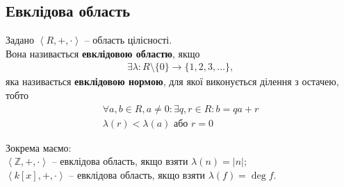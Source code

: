 \documentclass{math_library}
\begin{document}

\subsection{Евклідова область}
\begin{definition}
Задано $\left< R, +, \cdot \right>$ -- область цілісності.\\
Вона називається \textbf{евклідовою областю}, якщо
\begin{align*}
\exists \lambda \colon R \setminus \{0\} \to \{1,2,3,\dots\},
\end{align*}
яка називається \textbf{евклідовою нормою}, для якої виконується ділення з остачею, тобто
\begin{align*}
\forall a,b \in R, a \neq 0: \exists q,r \in R: b = qa+r \\
\lambda(r) < \lambda(a) \text{ або } r = 0
\end{align*}
\end{definition}

\begin{example}
Зокрема маємо:\\
$\left< \mathbb{Z},+,\cdot \right>$ -- евклідова область, якщо взяти $\lambda(n) = |n|$;\\
$\left< k[x], +, \cdot \right>$ -- евклідова область, якщо взяти $\lambda(f) = \deg f$.
\end{example}
\end{document}
